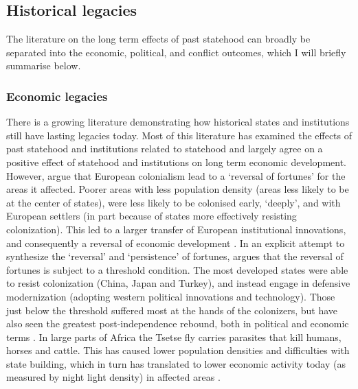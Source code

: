 \subsection{Historical legacies} \label{Historical legacies}

The literature on the long term effects of past statehood can broadly be
separated into the economic, political, and conflict outcomes, which I will
briefly summarise below.

\subsubsection{Economic legacies} \label{Economic legacies}

There is a growing literature demonstrating how historical states and
institutions still have lasting legacies today. Most of this literature has
examined the effects of past statehood \citep{Bockstette2002, Borcan2018} and
institutions related to statehood \citep{Michalopoulos2013, Michalopoulos2018,
Englebert2000} and largely agree on a positive effect of statehood and
institutions \citep{Nunn_2020, Michalopoulos2016} on long term economic
development. However, \citet{Acemoglu_2002} argue that European colonialism lead
to a `reversal  of fortunes' for the areas it affected. Poorer areas with less
population density (areas less likely to be at the center of states), were less
likely to be colonised early, `deeply', and with European settlers (in part
because of states more effectively resisting colonization). This led to a larger
transfer of European institutional innovations, and consequently a reversal of
economic development \citep{Acemoglu_2002}. In an explicit attempt to synthesize
the `reversal' and `persistence' of fortunes, \citep{Foa_2017} argues that the
reversal of fortunes is subject to a threshold condition. The most developed
states were able to resist colonization (China, Japan and Turkey), and instead
engage in defensive modernization (adopting western political innovations and
technology). Those just below the threshold suffered most at the hands of the
colonizers, but have also seen the greatest post-independence rebound, both in
political and economic terms \citep{Foa_2017}. In large parts of Africa the
Tsetse fly carries parasites that kill humans, horses and cattle. This has
caused lower population densities and difficulties with state building, which in
turn has translated to lower economic activity today (as measured by night light
density) in affected areas \citep{Alsan_2015}.

